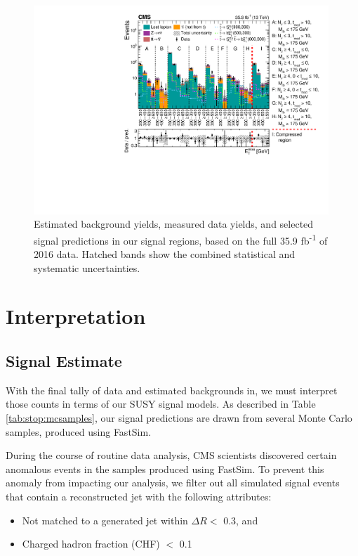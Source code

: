 \begin{figure}[htb]
\centering
\includegraphics[width=0.99\textwidth]{figures/ResultPlot_Moriond2017.pdf}
\caption{Estimated background yields, measured data yields, and
  selected signal predictions in our signal regions, based on the full
  35.9 fb\textsuperscript{-1} of 2016 data. Hatched bands show the
  combined statistical and systematic uncertainties.}
\label{fig:stop:results}
\end{figure}

\section{Interpretation}
\label{sec:stop:interp}

\subsection{Signal Estimate}
\label{ssec:stop:signal}

With the final tally of data and estimated backgrounds in, we must
interpret those counts in terms of our SUSY signal models. As
described in Table \ref{tab:stop:mcsamples}, our signal predictions
are drawn from several Monte Carlo samples, produced using FastSim.

During the course of routine data analysis, CMS scientists discovered
certain anomalous events in the samples produced using FastSim. To
prevent this anomaly from impacting our analysis, we filter out all
simulated signal events that contain a reconstructed jet with the
following attributes:
\begin{itemize}
\item Not matched to a generated jet within $\Delta R <$ 0.3, and
\item Charged hadron fraction (CHF) $<$ 0.1
\end{itemize}

